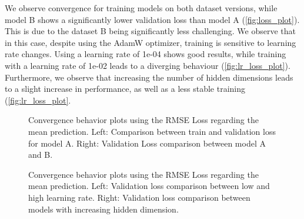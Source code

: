 We observe convergence for training models on both dataset versions, while model B shows a significantly lower validation loss than model A (\autoref{fig:loss_plot}). This is due to the dataset B being significantly less challenging. We observe that in this case, despite using the AdamW optimizer, training is sensitive to learning rate changes. Using a learning rate of 1e-04 shows good results, while training with a learning rate of 1e-02 leads to a diverging behaviour (\autoref{fig:lr_loss_plot}). Furthermore, we observe that increasing the number of hidden dimensions leads to a slight increase in performance, as well as a less stable training (\autoref{fig:lr_loss_plot}.

\begin{figure*}
	\centering
	\resizebox{0.6\textwidth}{!}{
		
		
	}
\label{fig:loss_plot}
\caption{Convergence behavior plots using the RMSE Loss regarding the mean prediction. Left: Comparison between train and validation loss for model A. Right: Validation Loss comparison between model A and B.}
\end{figure*}

\begin{figure*}
	\centering
	\resizebox{0.6\textwidth}{!}{
		
		
	}
\caption{Convergence behavior plots using the RMSE Loss regarding the mean prediction. Left: Validation loss comparison between low and high learning rate. Right: Validation loss comparison between models with increasing hidden dimension.}
\label{fig:lr_loss_plot}
\end{figure*}

